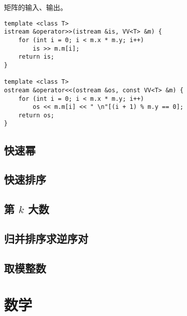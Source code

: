 \documentclass{probook}
\begin{document}
\begin{multicols}{2}
矩阵的输入、输出。

\begin{lstlisting}[style=cpp]
template <class T>
istream &operator>>(istream &is, VV<T> &m) {
	for (int i = 0; i < m.x * m.y; i++)
		is >> m.m[i];
	return is;
}

template <class T>
ostream &operator<<(ostream &os, const VV<T> &m) {
	for (int i = 0; i < m.x * m.y; i++)
		os << m.m[i] << " \n"[(i + 1) % m.y == 0];
	return os;
}
\end{lstlisting}

\section{快速幂}





\section{快速排序}



\section{\texorpdfstring{第 $k$ 大数}{第 k 大数}}



\section{归并排序求逆序对}



\section{取模整数}









\chapter{数学}


\end{multicols}
\end{document}
